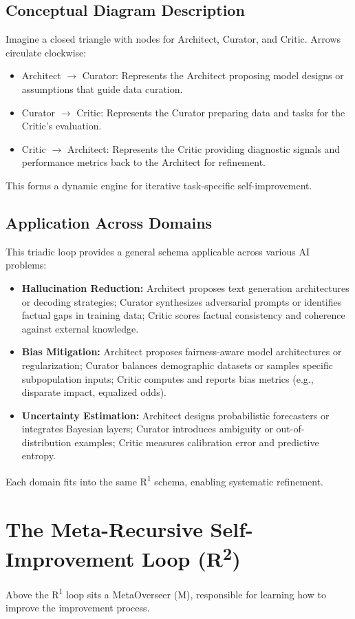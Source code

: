 \documentclass{article}
\begin{document}
\subsection{Conceptual Diagram Description}
Imagine a closed triangle with nodes for Architect, Curator, and Critic. Arrows circulate clockwise:
\begin{itemize}
    \item Architect $\rightarrow$ Curator: Represents the Architect proposing model designs or assumptions that guide data curation.
    \item Curator $\rightarrow$ Critic: Represents the Curator preparing data and tasks for the Critic's evaluation.
    \item Critic $\rightarrow$ Architect: Represents the Critic providing diagnostic signals and performance metrics back to the Architect for refinement.
\end{itemize}
This forms a dynamic engine for iterative task-specific self-improvement.

\subsection{Application Across Domains}
This triadic loop provides a general schema applicable across various AI problems:
\begin{itemize}
    \item \textbf{Hallucination Reduction:} Architect proposes text generation architectures or decoding strategies; Curator synthesizes adversarial prompts or identifies factual gaps in training data; Critic scores factual consistency and coherence against external knowledge.
    \item \textbf{Bias Mitigation:} Architect proposes fairness-aware model architectures or regularization; Curator balances demographic datasets or samples specific subpopulation inputs; Critic computes and reports bias metrics (e.g., disparate impact, equalized odds).
    \item \textbf{Uncertainty Estimation:} Architect designs probabilistic forecasters or integrates Bayesian layers; Curator introduces ambiguity or out-of-distribution examples; Critic measures calibration error and predictive entropy.
\end{itemize}
Each domain fits into the same R\textsuperscript{1} schema, enabling systematic refinement.

\section{The Meta-Recursive Self-Improvement Loop (R\textsuperscript{2})}
Above the R\textsuperscript{1} loop sits a MetaOverseer (M), responsible for learning how to improve the improvement process.
\end{document}
